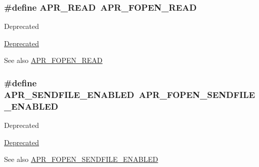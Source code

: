 \subsubsection[{\texorpdfstring{A\+P\+R\+\_\+\+R\+E\+AD}{APR_READ}}]{\setlength{\rightskip}{0pt plus 5cm}\#define A\+P\+R\+\_\+\+R\+E\+AD~{\bf A\+P\+R\+\_\+\+F\+O\+P\+E\+N\+\_\+\+R\+E\+AD}}\hypertarget{group__apr__file__open__flags_ga0021db78d799d1c8825b701c7efee483}{}\label{group__apr__file__open__flags_ga0021db78d799d1c8825b701c7efee483}
\begin{DoxyRefDesc}{Deprecated}
\item[\hyperlink{deprecated__deprecated000024}{Deprecated}]\end{DoxyRefDesc}
\begin{DoxySeeAlso}{See also}
\hyperlink{group__apr__file__open__flags_gaf9e7303f028b130ff7d4b209d6662d7d}{A\+P\+R\+\_\+\+F\+O\+P\+E\+N\+\_\+\+R\+E\+AD} 
\end{DoxySeeAlso}
\subsubsection[{\texorpdfstring{A\+P\+R\+\_\+\+S\+E\+N\+D\+F\+I\+L\+E\+\_\+\+E\+N\+A\+B\+L\+ED}{APR_SENDFILE_ENABLED}}]{\setlength{\rightskip}{0pt plus 5cm}\#define A\+P\+R\+\_\+\+S\+E\+N\+D\+F\+I\+L\+E\+\_\+\+E\+N\+A\+B\+L\+ED~{\bf A\+P\+R\+\_\+\+F\+O\+P\+E\+N\+\_\+\+S\+E\+N\+D\+F\+I\+L\+E\+\_\+\+E\+N\+A\+B\+L\+ED}}\hypertarget{group__apr__file__open__flags_ga17e216aadb23254580258889e10c53f3}{}\label{group__apr__file__open__flags_ga17e216aadb23254580258889e10c53f3}
\begin{DoxyRefDesc}{Deprecated}
\item[\hyperlink{deprecated__deprecated000036}{Deprecated}]\end{DoxyRefDesc}
\begin{DoxySeeAlso}{See also}
\hyperlink{group__apr__file__open__flags_ga60c21e28e4a612d58a874fe2cc71a6e4}{A\+P\+R\+\_\+\+F\+O\+P\+E\+N\+\_\+\+S\+E\+N\+D\+F\+I\+L\+E\+\_\+\+E\+N\+A\+B\+L\+ED} 
\end{DoxySeeAlso}
